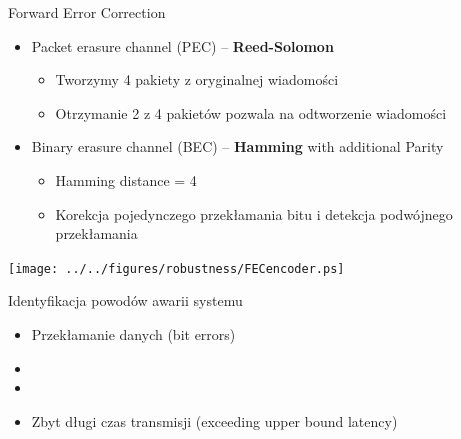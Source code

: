 \documentclass[compress,red]{beamer}
\begin{document}
\begin{frame}{Forward Error Correction}

      \begin{itemize}
	\item Packet erasure channel (PEC) -- {\bf Reed-Solomon}
	\begin{itemize}
	  \item Tworzymy 4 pakiety z oryginalnej wiadomości
	  \item Otrzymanie 2 z 4 pakietów pozwala na odtworzenie wiadomości
	\end{itemize}
	\item Binary erasure channel (BEC) -- {\bf Hamming} with additional Parity
	\begin{itemize}
	  \item Hamming distance = 4
	  \item Korekcja pojedynczego przekłamania bitu i detekcja podwójnego przekłamania
	\end{itemize}    
      \end{itemize}


      \begin{center}
      \texttt{[image: ../../figures/robustness/FECencoder.ps]}
      \end{center}

\end{frame}
\begin{frame}{Identyfikacja powodów awarii systemu}


  \begin{itemize}
    \item Przekłamanie danych (bit errors)
    \item  {}
    \item \color{black}{Awaria elementów sieci (element failure)}
    \item Zbyt długi czas transmisji (exceeding upper bound latency)
  \end{itemize}

\end{frame}
\end{document}
